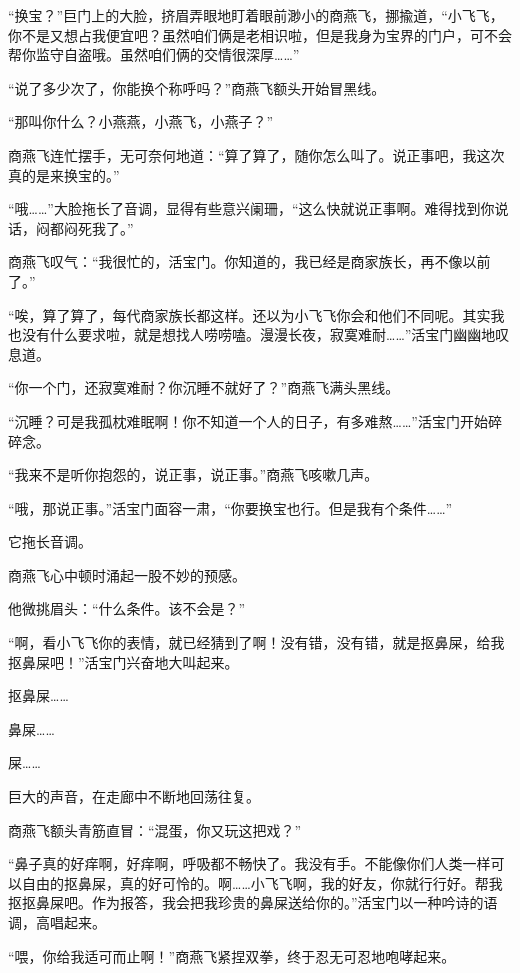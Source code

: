 
\begin{this_body}

“换宝？”巨门上的大脸，挤眉弄眼地盯着眼前渺小的商燕飞，挪揄道，“小飞飞，你不是又想占我便宜吧？虽然咱们俩是老相识啦，但是我身为宝界的门户，可不会帮你监守自盗哦。虽然咱们俩的交情很深厚……”

“说了多少次了，你能换个称呼吗？”商燕飞额头开始冒黑线。

“那叫你什么？小燕燕，小燕飞，小燕子？”

商燕飞连忙摆手，无可奈何地道：“算了算了，随你怎么叫了。说正事吧，我这次真的是来换宝的。”

“哦……”大脸拖长了音调，显得有些意兴阑珊，“这么快就说正事啊。难得找到你说话，闷都闷死我了。”

商燕飞叹气：“我很忙的，活宝门。你知道的，我已经是商家族长，再不像以前了。”

“唉，算了算了，每代商家族长都这样。还以为小飞飞你会和他们不同呢。其实我也没有什么要求啦，就是想找人唠唠嗑。漫漫长夜，寂寞难耐……”活宝门幽幽地叹息道。

“你一个门，还寂寞难耐？你沉睡不就好了？”商燕飞满头黑线。

“沉睡？可是我孤枕难眠啊！你不知道一个人的日子，有多难熬……”活宝门开始碎碎念。

“我来不是听你抱怨的，说正事，说正事。”商燕飞咳嗽几声。

“哦，那说正事。”活宝门面容一肃，“你要换宝也行。但是我有个条件……”

它拖长音调。

商燕飞心中顿时涌起一股不妙的预感。

他微挑眉头：“什么条件。该不会是？”

“啊，看小飞飞你的表情，就已经猜到了啊！没有错，没有错，就是抠鼻屎，给我抠鼻屎吧！”活宝门兴奋地大叫起来。

抠鼻屎……

鼻屎……

屎……

巨大的声音，在走廊中不断地回荡往复。

商燕飞额头青筋直冒：“混蛋，你又玩这把戏？”

“鼻子真的好痒啊，好痒啊，呼吸都不畅快了。我没有手。不能像你们人类一样可以自由的抠鼻屎，真的好可怜的。啊……小飞飞啊，我的好友，你就行行好。帮我抠抠鼻屎吧。作为报答，我会把我珍贵的鼻屎送给你的。”活宝门以一种吟诗的语调，高唱起来。

“喂，你给我适可而止啊！”商燕飞紧捏双拳，终于忍无可忍地咆哮起来。


\end{this_body}
